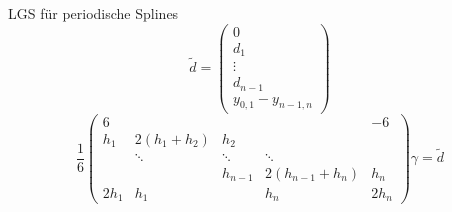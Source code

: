 \begin{flashcard}[LGS]{LGS für periodische Splines}
	$$
		\tilde{d} = \begin{pmatrix}
			0\\
			d_1\\
			\vdots\\
			d_{n-1}\\
			y_{0,1} - y_{n-1,n}
		\end{pmatrix}
	$$
	$$
		\frac{1}{6}
		\begin{pmatrix}
			6 & & & & -6\\
			h_1 & 2(h_1 + h_2) & h_2 & & \\
			& \ddots & \ddots & \ddots & \\
			& & h_{n-1} & 2(h_{n-1} + h_n) & h_n\\
			2 h_1 & h_1 & & h_n & 2 h_n
		\end{pmatrix}
		\gamma = \tilde{d}
	$$
\end{flashcard}
